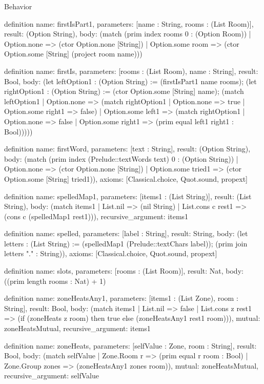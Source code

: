 \begin{lexlean}{Behavior}
\begin{semanticmodule}
definition{
  name: firstIsPart1,
  parameters: [name : String, rooms : (List Room)],
  result: (Option String),
  body: (match (prim index rooms 0 : (Option Room))
    | Option.none => (ctor Option.none [String])
    | Option.some room => (ctor Option.some [String] (project room name)))
}

definition{
  name: firstIs,
  parameters: [rooms : (List Room), name : String],
  result: Bool,
  body: (let leftOption1 : (Option String) := (firstIsPart1 name rooms); (let rightOption1 : (Option String) := (ctor Option.some [String] name); (match leftOption1
    | Option.none => (match rightOption1 | Option.none => true | Option.some right1 => false)
    | Option.some left1 => (match rightOption1
      | Option.none => false
      | Option.some right1 => (prim equal left1 right1 : Bool)))))
}

definition{
  name: firstWord,
  parameters: [text : String],
  result: (Option String),
  body: (match (prim index (Prelude::textWords text) 0 : (Option String))
    | Option.none => (ctor Option.none [String])
    | Option.some tried1 => (ctor Option.some [String] tried1)),
  axioms: [Classical.choice, Quot.sound, propext]
}

definition{
  name: spelledMap1,
  parameters: [items1 : (List String)],
  result: (List String),
  body: (match items1
    | List.nil => (nil String)
    | List.cons c rest1 => (cons c (spelledMap1 rest1))),
  recursive_argument: items1
}

definition{
  name: spelled,
  parameters: [label : String],
  result: String,
  body: (let letters : (List String) := (spelledMap1 (Prelude::textChars label)); (prim join letters "." : String)),
  axioms: [Classical.choice, Quot.sound, propext]
}

definition{
  name: slots,
  parameters: [rooms : (List Room)],
  result: Nat,
  body: ((prim length rooms : Nat) + 1)
}

definition{
  name: zoneHeatsAny1,
  parameters: [items1 : (List Zone), room : String],
  result: Bool,
  body: (match items1
    | List.nil => false
    | List.cons z rest1 => (if (zoneHeats z room) then true else (zoneHeatsAny1 rest1 room))),
  mutual: zoneHeatsMutual,
  recursive_argument: items1
}

definition{
  name: zoneHeats,
  parameters: [selfValue : Zone, room : String],
  result: Bool,
  body: (match selfValue
    | Zone.Room r => (prim equal r room : Bool)
    | Zone.Group zones => (zoneHeatsAny1 zones room)),
  mutual: zoneHeatsMutual,
  recursive_argument: selfValue
}


\end{semanticmodule}
\end{lexlean}
